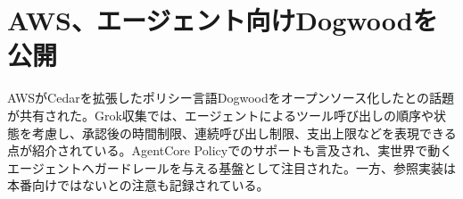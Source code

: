\section{AWS、エージェント向けDogwoodを公開}
AWSがCedarを拡張したポリシー言語Dogwoodをオープンソース化したとの話題が共有された。Grok収集では、エージェントによるツール呼び出しの順序や状態を考慮し、承認後の時間制限、連続呼び出し制限、支出上限などを表現できる点が紹介されている。AgentCore Policyでのサポートも言及され、実世界で動くエージェントへガードレールを与える基盤として注目された。一方、参照実装は本番向けではないとの注意も記録されている。
